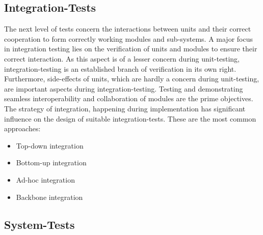 	\subsection{Integration-Tests}
		The next level of tests concern the interactions between units and their correct cooperation to form correctly working modules and sub-systems. A major focus in integration testing lies on the verification of units and modules to ensure their correct interaction. As this aspect is of a lesser concern during unit-testing, integration-testing is an established branch of verification in its own right. Furthermore, side-effects of units, which are hardly a concern during unit-testing, are important aspects during integration-testing. Testing and demonstrating seamless interoperability and collaboration of modules are the prime objectives. \cite{SpilSoft2005} %
		The strategy of integration, happening during implementation has significant influence on the design of suitable integration-tests. These are the most common approaches:
		\begin{itemize} \setlength\itemsep{1px}
		\item Top-down integration 
		\item Bottom-up integration 
		\item Ad-hoc integration 
		\item Backbone integration 
	\end{itemize} 


	\subsection{System-Tests}
	

